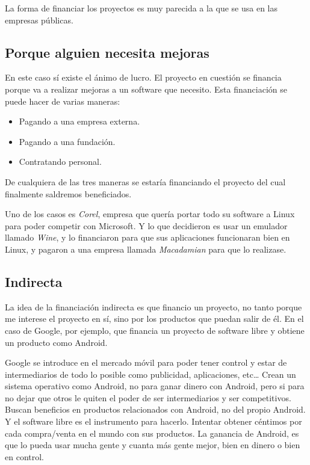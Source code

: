 La forma de financiar los proyectos es muy parecida a la que se usa en las
empresas públicas.


\subsection{Porque alguien necesita mejoras}
En este caso sí existe el ánimo de lucro. El proyecto en cuestión se financia
porque va a realizar mejoras a un software que necesito.
Esta financiación se puede hacer de varias maneras:
\begin{itemize}
  \item Pagando a una empresa externa.
  \item Pagando a una fundación.
  \item Contratando personal.
\end{itemize}

De cualquiera de las tres maneras se estaría financiando el proyecto del cual
finalmente saldremos beneficiados.


Uno de los casos es \emph{Corel}, empresa que quería portar todo su software a Linux para
poder competir con Microsoft. Y lo que decidieron es usar un emulador llamado
\emph{Wine}, y lo financiaron para que sus aplicaciones funcionaran bien en
Linux, y pagaron a una empresa llamada \emph{Macadamian} para que lo realizase.

\subsection{Indirecta}

La idea de la financiación indirecta es que financio un proyecto, no tanto
porque me interese el proyecto en sí, sino por los productos que puedan salir de
él. En el caso de Google, por ejemplo, que financia un proyecto de software
libre y obtiene un producto como Android.

Google se introduce en el mercado móvil para poder tener control y estar de
intermediarios de todo lo posible como publicidad, aplicaciones, etc\ldots
Crean un sistema operativo como Android, no para ganar dinero con Android, pero
si para no dejar que otros le quiten el poder de ser intermediarios y ser competitivos.
Buscan beneficios en productos relacionados con Android, no del propio Android.
Y el software libre es el instrumento para hacerlo. Intentar obtener céntimos
por cada compra/venta en el mundo con sus productos. La ganancia de Android, es
que lo pueda usar mucha gente y cuanta más gente mejor, bien en dinero o bien en
control.

